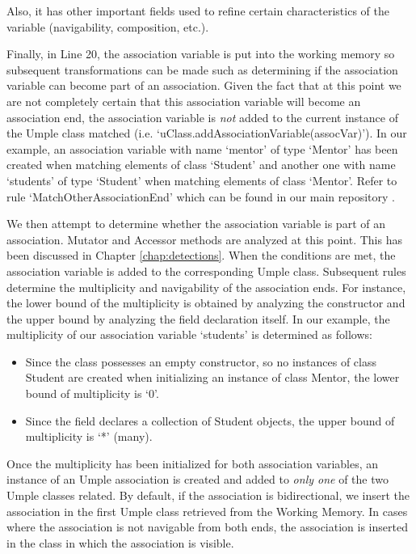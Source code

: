 Also, it has other important fields used to refine certain characteristics of the variable (navigability, composition, etc.).

Finally, in Line 20, the association variable is put into the working memory so subsequent transformations can be made such as determining if the association variable can become part of an association. Given the fact that at this point we are not completely certain that this association variable will become an association end, the association variable is \textit{not} added to the current instance of the Umple class matched (i.e. `uClass.addAssociationVariable(assocVar)'). In our example, an association variable with name `mentor' of type `Mentor' has been created when matching elements of class `Student' and another one with name `students' of type `Student' when matching elements of class `Mentor'. Refer to rule  `MatchOtherAssociationEnd' which can be found in our main repository \cite{MappingRulesRepository}. 

We then attempt to determine whether the association variable is part of an association. Mutator and Accessor methods are analyzed at this point. This has been discussed in Chapter \ref{chap:detections}.
When the conditions are met, the association variable is added to the corresponding Umple class. Subsequent rules determine the multiplicity and navigability of the association ends. For instance, the lower bound of the multiplicity is obtained by analyzing the constructor and the upper bound by analyzing the field declaration itself. In our example, the multiplicity of our association variable `students' is determined as follows:

\begin{itemize}
\item Since the class possesses an empty constructor, so no instances of class Student are created when initializing an instance of class Mentor, the lower bound of multiplicity is `0'.
\item Since the field declares a collection of Student objects, the upper bound of multiplicity is `*' (many).
\end{itemize}

Once the multiplicity has been initialized for both association variables, an instance of an Umple association is created and added to \textit{only one} of the two Umple classes related. By default, if the association is bidirectional, we insert the association in the first Umple class retrieved from the Working Memory. In cases where the association is not navigable from both ends, the association is inserted in the class in which the association is visible.

